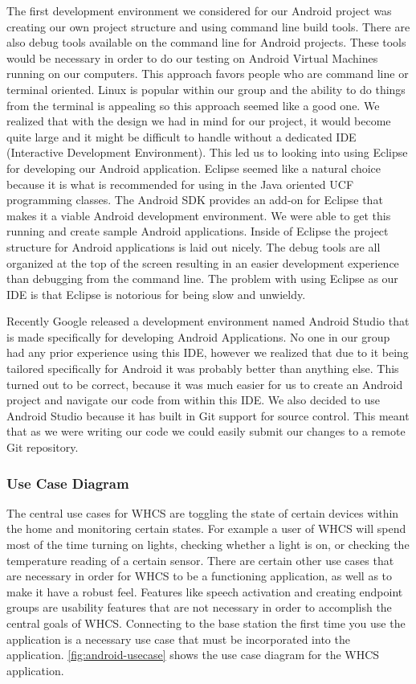 The first development environment we considered for our Android project was
creating our own project structure and using command line build tools. There
are also debug tools available on the command line for Android projects. These
tools would be necessary in order to do our testing on Android Virtual Machines
running on our computers. This approach favors people who are command line or
terminal oriented. Linux is popular within our group and the ability to do
things from the terminal is appealing so this approach seemed like a good one.
We realized that with the design we had in mind for our project, it would
become quite large and it might be difficult to handle without a dedicated IDE
(Interactive Development Environment). This led us to looking into using
Eclipse for developing our Android application. Eclipse seemed like a natural
choice because it is what is recommended for using in the Java oriented UCF
programming classes.  The Android SDK provides an add{}-on for Eclipse that
makes it a viable Android development environment. We were able to get this
running and create sample Android applications. Inside of Eclipse the project
structure for Android applications is laid out nicely. The debug tools are all
organized at the top of the screen resulting in an easier development
experience than debugging from the command line. The problem with using Eclipse
as our IDE is that Eclipse is notorious for being slow and unwieldy.

\color{black} Recently Google released a development environment named Android
Studio that is made specifically for developing Android Applications. No one in
our group had any prior experience using this IDE, however we realized that due
to it being tailored specifically for Android it was probably better than
anything else. This turned out to be correct, because it was much easier for us
to create an Android project and navigate our code from within this IDE. We
also decided to use Android Studio because it has built in Git support for
source control. This meant that as we were
writing our code we could easily submit our changes to a remote Git repository.

\subsubsection{Use Case Diagram} The central use cases for WHCS are toggling
the state of certain devices within the home and monitoring certain states.
For example a user of WHCS will spend most of the time turning on lights,
checking whether a light is on, or checking the temperature reading of a
certain sensor. There are certain other use cases that are necessary in order
for WHCS to be a functioning application, as well as to make it have a robust
feel. Features like speech activation and creating endpoint groups are
usability features that are not necessary in order to accomplish the central
goals of WHCS.  Connecting to the base station the first time you use the
application is a necessary use case that must be incorporated into the
application. \autoref{fig:android-usecase} shows the use case diagram for the
WHCS application.

